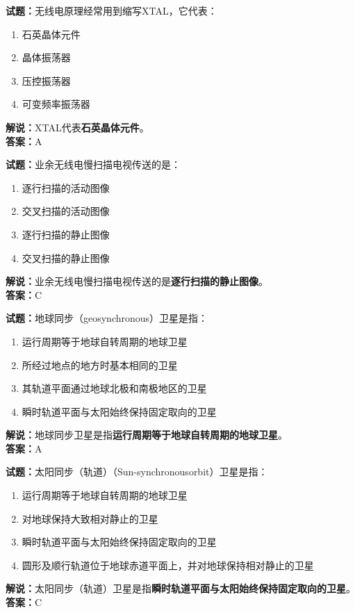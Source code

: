\documentclass{ctexbook}
\begin{document}
\bigskip


\noindent\textbf{试题：}无线电原理经常用到缩写XTAL，它代表：
\begin{enumerate}[leftmargin=3em]
\item 石英晶体元件
\item 晶体振荡器
\item 压控振荡器
\item 可变频率振荡器
\end{enumerate}
\noindent\textbf{解说：}XTAL代表\textbf{石英晶体元件}。\\\noindent\textbf{答案：}A



\bigskip


\noindent\textbf{试题：}业余无线电慢扫描电视传送的是：
\begin{enumerate}[leftmargin=3em]
\item 逐行扫描的活动图像
\item 交叉扫描的活动图像
\item 逐行扫描的静止图像
\item 交叉扫描的静止图像
\end{enumerate}
\noindent\textbf{解说：}业余无线电慢扫描电视传送的是\textbf{逐行扫描的静止图像}。\\\noindent\textbf{答案：}C



\bigskip


\noindent\textbf{试题：}地球同步（geosynchronous）卫星是指：
\begin{enumerate}[leftmargin=3em]
\item 运行周期等于地球自转周期的地球卫星
\item 所经过地点的地方时基本相同的卫星
\item 其轨道平面通过地球北极和南极地区的卫星
\item 瞬时轨道平面与太阳始终保持固定取向的卫星
\end{enumerate}
\noindent\textbf{解说：}地球同步卫星是指\textbf{运行周期等于地球自转周期的地球卫星}。\\\noindent\textbf{答案：}A




\bigskip


\noindent\textbf{试题：}太阳同步（轨道）（Sun-synchronousorbit）卫星是指：
\begin{enumerate}[leftmargin=3em]
\item 运行周期等于地球自转周期的地球卫星
\item 对地球保持大致相对静止的卫星
\item 瞬时轨道平面与太阳始终保持固定取向的卫星
\item 圆形及顺行轨道位于地球赤道平面上，并对地球保持相对静止的卫星
\end{enumerate}
\noindent\textbf{解说：}太阳同步（轨道）卫星是指\textbf{瞬时轨道平面与太阳始终保持固定取向的卫星}。\\\noindent\textbf{答案：}C
\end{document}
